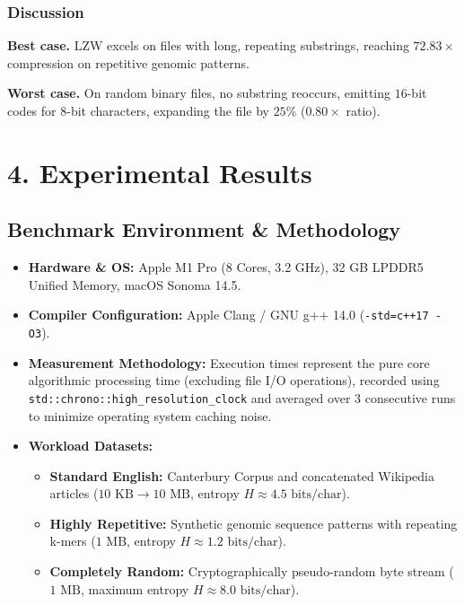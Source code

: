 \documentclass{article}
\begin{document}
\subsubsection{Discussion}
\textbf{Best case.} LZW excels on files with long, repeating substrings, reaching $72.83\times$ compression on repetitive genomic patterns.

\textbf{Worst case.} On random binary files, no substring reoccurs, emitting $16$-bit codes for $8$-bit characters, expanding the file by $25\%$ ($0.80\times$ ratio).

\cleardoublepage
\newpage

\section*{4. Experimental Results}
\setcounter{section}{4}
\setcounter{subsection}{0}
\setcounter{subsubsection}{0}

\subsection{Benchmark Environment \& Methodology}
\begin{itemize}
    \item \textbf{Hardware \& OS:} Apple M1 Pro (8 Cores, 3.2 GHz), 32 GB LPDDR5 Unified Memory, macOS Sonoma 14.5.
    \item \textbf{Compiler Configuration:} Apple Clang / GNU g++ 14.0 (\texttt{-std=c++17 -O3}).
    \item \textbf{Measurement Methodology:} Execution times represent the pure core algorithmic processing time (excluding file I/O operations), recorded using \texttt{std::chrono::high\_resolution\_clock} and averaged over 3 consecutive runs to minimize operating system caching noise.
    \item \textbf{Workload Datasets:}
    \begin{itemize}
        \item \textbf{Standard English:} Canterbury Corpus and concatenated Wikipedia articles ($10\text{ KB} \to 10\text{ MB}$, entropy $H \approx 4.5\text{ bits/char}$).
        \item \textbf{Highly Repetitive:} Synthetic genomic sequence patterns with repeating k-mers ($1\text{ MB}$, entropy $H \approx 1.2\text{ bits/char}$).
        \item \textbf{Completely Random:} Cryptographically pseudo-random byte stream ($1\text{ MB}$, maximum entropy $H \approx 8.0\text{ bits/char}$).
    \end{itemize}
\end{itemize}
\end{document}
